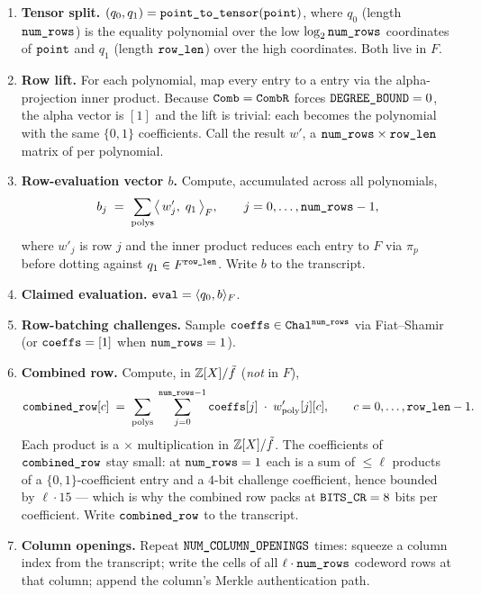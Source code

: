 \begin{enumerate}
  \item \textbf{Tensor split.}
    $(q_0, q_1) = \texttt{point\_to\_tensor}(\texttt{point})$, where $q_0$
    (length $\texttt{num\_rows}$) is the equality polynomial over the
    low $\log_2\texttt{num\_rows}$ coordinates of $\texttt{point}$ and
    $q_1$ (length $\texttt{row\_len}$) over the high coordinates. Both
    live in $F$.
  \item \textbf{Row lift.} For each polynomial, map every 
    entry to a  entry via the alpha-projection inner
    product. Because $\texttt{Comb} = \texttt{CombR}$ forces
    $\texttt{DEGREE\_BOUND} = 0$, the alpha vector is $[1]$ and the lift
    is trivial: each  becomes the 
    polynomial with the same $\{0,1\}$ coefficients. Call the result
    $w'$, a $\texttt{num\_rows}\times\texttt{row\_len}$ matrix of
     per polynomial.
  \item \textbf{Row-evaluation vector $b$.} Compute, accumulated
    across all polynomials,
    \[
      b_j \;=\; \sum_{\text{polys}} \bigl\langle\, w'_j,\; q_1 \,\bigr\rangle_F,
      \qquad j = 0,\ldots,\texttt{num\_rows}-1,
    \]
    where $w'_j$ is row $j$ and the inner product reduces each
     entry to $F$ via $\pi_p$ before dotting against
    $q_1 \in F^{\texttt{row\_len}}$. Write $b$ to the transcript.
  \item \textbf{Claimed evaluation.}
    $\texttt{eval} = \langle q_0, b\rangle_F$.
  \item \textbf{Row-batching challenges.} Sample
    $\texttt{coeffs} \in \texttt{Chal}^{\texttt{num\_rows}}$ via
    Fiat--Shamir (or $\texttt{coeffs} = [1]$ when
    $\texttt{num\_rows} = 1$).
  \item \textbf{Combined row.} Compute, in $\mathbb{Z}[X]/\tilde f$ (\emph{not} in
    $F$),
    \[
      \texttt{combined\_row}[c] \;=\;
      \sum_{\text{polys}} \;\sum_{j=0}^{\texttt{num\_rows}-1}
      \texttt{coeffs}[j]\;\cdot\; w'_{\text{poly}}[j][c],
      \qquad c = 0,\ldots,\texttt{row\_len}-1.
    \]
    Each product is a  $\times$ 
    multiplication in $\mathbb{Z}[X]/\tilde f$. The coefficients of
    $\texttt{combined\_row}$ stay small: at $\texttt{num\_rows} = 1$ each
    is a sum of $\le \ell$ products of a $\{0,1\}$-coefficient entry
    and a $4$-bit challenge coefficient, hence bounded by
    $\ell \cdot 15$ --- which is why the combined row packs at
    $\texttt{BITS\_CR} = 8$ bits per coefficient. Write
    $\texttt{combined\_row}$ to the transcript.
  \item \textbf{Column openings.} Repeat $\texttt{NUM\_COLUMN\_OPENINGS}$
    times: squeeze a column index from the transcript; write the
     cells of all $\ell\cdot\texttt{num\_rows}$ codeword rows
    at that column; append the column's Merkle authentication path.
\end{enumerate}

